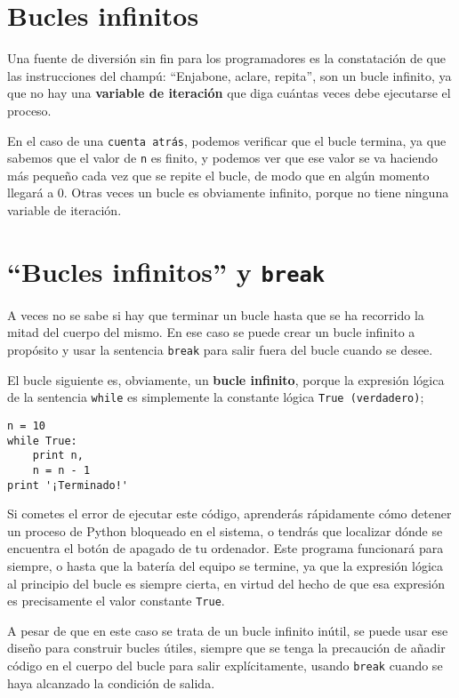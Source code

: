 \section{Bucles infinitos}

Una fuente de diversión sin fin para
los programadores es la constatación de que las instrucciones del champú:
``Enjabone, aclare, repita'', son un bucle infinito, ya que
no hay una {\bf variable de iteración} que diga cuántas veces
debe ejecutarse el proceso.


En el caso de una {\tt cuenta atrás}, podemos verificar que el bucle
termina, ya que sabemos que el valor de {\tt n} es finito, y podemos
ver que ese valor se va haciendo más pequeño cada vez que
se repite el bucle, de modo que en algún momento llegará a 0. Otras veces
un bucle es obviamente infinito, porque no tiene ninguna variable de iteración.

\section{``Bucles infinitos'' y {\tt break}}

A veces no se sabe si hay que terminar un bucle hasta que se ha
recorrido la mitad del cuerpo del mismo. En ese caso se puede crear un bucle infinito a propósito
y usar la sentencia {\tt break} para salir fuera del bucle cuando se desee.

El bucle siguiente es, obviamente, un {\bf bucle infinito}, porque la
expresión lógica de la sentencia
{\tt while} es simplemente la constante lógica {\tt True (verdadero)};

\beforeverb
\begin{verbatim}
n = 10
while True:
    print n, 
    n = n - 1
print '¡Terminado!'
\end{verbatim}
\afterverb
%
Si cometes el error de ejecutar este código, aprenderás rápidamente cómo
detener un proceso de Python bloqueado en el sistema, o tendrás que localizar dónde
se encuentra el botón de apagado de tu ordenador.
Este programa funcionará para siempre,
o hasta que la batería del equipo se termine,
ya que la expresión lógica al principio del bucle
es siempre cierta, en virtud del hecho de que esa expresión es
precisamente el valor constante {\tt True}.
 
A pesar de que en este caso se trata de un bucle infinito inútil, se puede usar ese diseño
para construir bucles útiles, siempre que se tenga la precaución de añadir código
en el cuerpo del bucle para salir explícitamente, usando {\tt break}
cuando se haya alcanzado la condición de salida.

